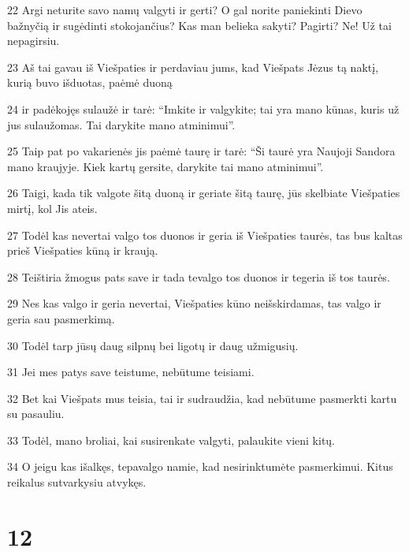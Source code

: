 \par 22 Argi neturite savo namų valgyti ir gerti? O gal norite paniekinti Dievo bažnyčią ir sugėdinti stokojančius? Kas man belieka sakyti? Pagirti? Ne! Už tai nepagirsiu. 
\par 23 Aš tai gavau iš Viešpaties ir perdaviau jums, kad Viešpats Jėzus tą naktį, kurią buvo išduotas, paėmė duoną 
\par 24 ir padėkojęs sulaužė ir tarė: “Imkite ir valgykite; tai yra mano kūnas, kuris už jus sulaužomas. Tai darykite mano atminimui”. 
\par 25 Taip pat po vakarienės jis paėmė taurę ir tarė: “Ši taurė yra Naujoji Sandora mano kraujyje. Kiek kartų gersite, darykite tai mano atminimui”. 
\par 26 Taigi, kada tik valgote šitą duoną ir geriate šitą taurę, jūs skelbiate Viešpaties mirtį, kol Jis ateis. 
\par 27 Todėl kas nevertai valgo tos duonos ir geria iš Viešpaties taurės, tas bus kaltas prieš Viešpaties kūną ir kraują. 
\par 28 Teištiria žmogus pats save ir tada tevalgo tos duonos ir tegeria iš tos taurės. 
\par 29 Nes kas valgo ir geria nevertai, Viešpaties kūno neišskirdamas, tas valgo ir geria sau pasmerkimą. 
\par 30 Todėl tarp jūsų daug silpnų bei ligotų ir daug užmigusių. 
\par 31 Jei mes patys save teistume, nebūtume teisiami. 
\par 32 Bet kai Viešpats mus teisia, tai ir sudraudžia, kad nebūtume pasmerkti kartu su pasauliu. 
\par 33 Todėl, mano broliai, kai susirenkate valgyti, palaukite vieni kitų. 
\par 34 O jeigu kas išalkęs, tepavalgo namie, kad nesirinktumėte pasmerkimui. Kitus reikalus sutvarkysiu atvykęs.


\chapter{12}


